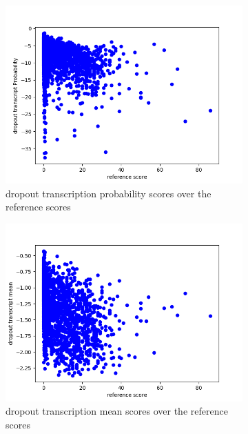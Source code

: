 \begin{figure}[h]
    \centering
    \begin{subfigure}{0.4\linewidth}
        \includegraphics[width=\textwidth]{Latex/sections/images/seamlessdropouttranscript.png}
        \caption{dropout transcription probability scores over the reference scores}
    \end{subfigure}
    \begin{subfigure}{0.4\linewidth}
        \includegraphics[width=\textwidth]{Latex/sections/images/seamlessdropouttranscriptmean.png}
        \caption{dropout transcription mean scores over the reference scores}
    \end{subfigure}
    \begin{subfigure}{0.4\linewidth}

\end{subfigure}
\end{figure}
